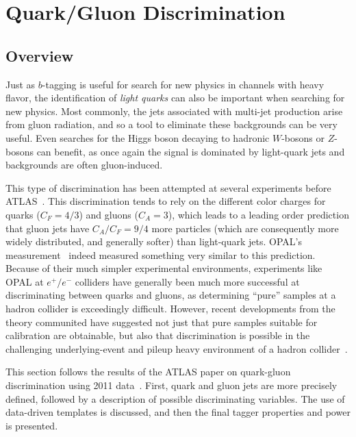 
\section{Quark/Gluon Discrimination}
\label{jet-reconstruction:qg}
\subsection{Overview}
\label{jet-reconstruction:qg:overview}

Just as $b$-tagging is useful for search for new physics in channels with heavy flavor, the identification of \textit{light quarks} can also be important when searching for new physics. Most commonly, the jets associated with multi-jet production arise from gluon radiation, and so a tool to eliminate these backgrounds can be very useful. Even searches for the Higgs boson decaying to hadronic $W$-bosons or $Z$-bosons can benefit, as once again the signal is dominated by light-quark jets and backgrounds are often gluon-induced.

This type of discrimination has been attempted at several experiments before ATLAS~\cite{TevatronShapes1,QGNN,Pumplin,QGopal,Ariel,QGsub,QGlep,QGcleo,DelphiQG,DelphiQG2,AlephQG,L3QG}. This discrimination tends to rely on the different color charges for quarks ($C_F=4/3$) and gluons ($C_A=3$), which leads to a leading order prediction that gluon jets have $C_A/C_F = 9/4$ more particles (which are consequently more widely distributed, and generally softer) than light-quark jets. OPAL's measurement~\cite{QGopal} indeed measured something very similar to this prediction. Because of their much simpler experimental environments, experiments like OPAL at $e^+/e^-$ colliders have generally been much more successful at discriminating between quarks and gluons, as determining ``pure'' samples at a hadron collider is exceedingly difficult. However, recent developments from the theory communited have suggested not just that pure samples suitable for calibration are obtainable, but also that discrimination is possible in the challenging underlying-event and pileup heavy environment of a hadron collider~\cite{schwartz1,schwartz2}. 

This section follows the results of the ATLAS paper on quark-gluon discrimination using 2011 data~\cite{ATLASqg}. First, quark and gluon jets are more precisely defined, followed by a description of possible discriminating variables. The use of data-driven templates is discussed, and then the final tagger properties and power is presented.

